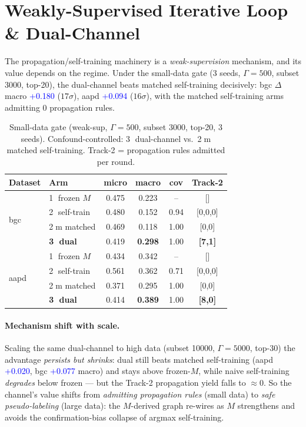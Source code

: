 \documentclass[11pt]{article}
\newcommand{\bld}[1]{\textbf{#1}}\newcommand{\gn}[1]{\textcolor{blue}{#1}}
\begin{document}
\section{Weakly-Supervised Iterative Loop \& Dual-Channel}
\label{sec:iter}
The propagation/self-training machinery is a \emph{weak-supervision} mechanism, and its value depends on
the regime. Under the small-data gate (3 seeds, $\Gamma{=}500$, subset 3000, top-20), the dual-channel
beats matched self-training decisively: bgc $\Delta$macro \gn{+0.180} ($17\sigma$), aapd \gn{+0.094}
($16\sigma$), with the matched self-training arms admitting 0 propagation rules.
\begin{table}[h]\centering\small
\caption{Small-data gate (weak-sup, $\Gamma{=}500$, subset 3000, top-20, 3 seeds). Confound-controlled:
\textcircled{3} dual-channel vs.\ \textcircled{2}m matched self-training. Track-2 = propagation rules
admitted per round.}
\label{tab:gate}
\begin{tabular}{llcccc}\toprule
Dataset & Arm & micro & macro & cov & Track-2\\\midrule
\multirow{4}{*}{bgc}&\textcircled{1} frozen $M$&0.475&0.223&--&[]\\
&\textcircled{2} self-train&0.480&0.152&0.94&[0,0,0]\\
&\textcircled{2}m matched&0.469&0.118&1.00&[0,0]\\
&\bld{\textcircled{3} dual}&0.419&\bld{0.298}&1.00&\bld{[7,1]}\\\midrule
\multirow{4}{*}{aapd}&\textcircled{1} frozen $M$&0.434&0.342&--&[]\\
&\textcircled{2} self-train&0.561&0.362&0.71&[0,0,0]\\
&\textcircled{2}m matched&0.371&0.295&1.00&[0,0]\\
&\bld{\textcircled{3} dual}&0.414&\bld{0.389}&1.00&\bld{[8,0]}\\\bottomrule
\end{tabular}\end{table}
\paragraph{Mechanism shift with scale.} Scaling the same dual-channel to high data (subset
10000, $\Gamma{=}5000$, top-30) the advantage \emph{persists but shrinks}: dual still beats matched
self-training (aapd \gn{+0.020}, bgc \gn{+0.077} macro) and stays above frozen-$M$, while naive
self-training \emph{degrades} below frozen --- but the Track-2 propagation yield falls to $\approx0$. So
the channel's value shifts from \emph{admitting propagation rules} (small data) to \emph{safe
pseudo-labeling} (large data): the $M$-derived graph re-wires as $M$ strengthens and avoids the
confirmation-bias collapse of argmax self-training.
\end{document}
